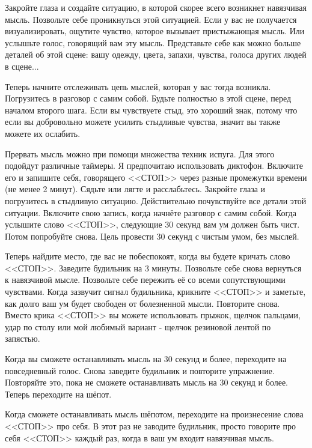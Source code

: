 \documentclass[10pt, fleqn]{article}
\begin{document}
Закройте глаза и создайте ситуацию, в которой скорее всего возникнет навязчивая мысль. Позвольте себе проникнуться этой ситуацией. Если у вас не получается визуализировать, ощутите чувство, которое вызывает пристыжающая мысль. Или услышьте голос, говорящий вам эту мысль. Представьте себе как можно больше деталей об этой сцене: вашу одежду, цвета, запахи, чувства, голоса других людей в сцене...

Теперь начните отслеживать цепь мыслей, которая у вас тогда возникла. Погрузитесь в разговор с самим собой. Будьте полностью в этой сцене, перед началом второго шага. Если вы чувствуете стыд, это хороший знак, потому что если вы добровольно можете усилить стыдливые чувства, значит вы также можете их ослабить.


Прервать мысль можно при помощи множества техник испуга. Для этого подойдут различные таймеры. Я предпочитаю использовать диктофон. Включите его и запишите себя, говорящего <<СТОП>> через разные промежутки времени (не менее 2 минут). Сядьте или лягте и расслабьтесь. Закройте глаза и погрузитесь в стыдливую ситуацию. Действительно почувствуйте все детали этой ситуации. Включите свою запись, когда начнёте разговор с самим собой. Когда услышите слово <<СТОП>>, следующие 30 секунд вам ум должен быть чист. Потом попробуйте снова. Цель провести 30 секунд с чистым умом, без мыслей.


Теперь найдите место, где вас не побеспокоят, когда вы будете кричать слово <<СТОП>>. Заведите будильник на 3 минуты. Позвольте себе снова вернуться к навязчивой мысле. Позвольте себе пережить её со всеми сопутствующими чувствами. Когда зазвучит сигнал будильника, крикните <<СТОП>> и заметьте, как долго ваш ум будет свободен от болезненной мысли. Повторите снова. Вместо крика <<СТОП>> вы можете использовать прыжок, щелчок пальцами, удар по столу или мой любимый вариант - щелчок резиновой лентой по запястью.

Когда вы сможете останавливать мысль на 30 секунд и более, переходите на повседневный голос. Снова заведите будильник и повторите упражнение. Повторяйте это, пока не сможете останавливать мысль на 30 секунд и более. Теперь переходите на шёпот.

Когда сможете останавливать мысль шёпотом, переходите на произнесение слова <<СТОП>> про себя. В этот раз не заводите будильник, просто говорите про себя <<СТОП>> каждый раз, когда в ваш ум входит навязчивая мысль. 
\end{document}
